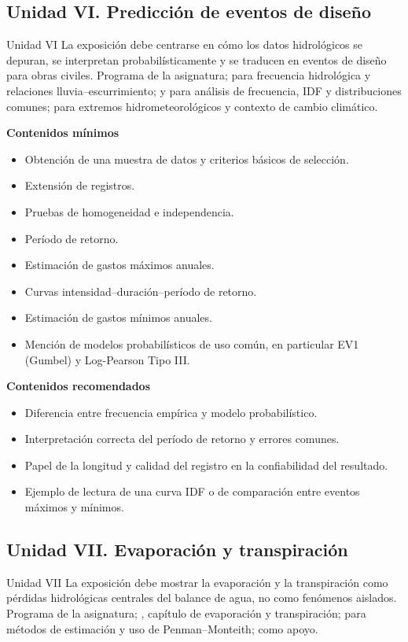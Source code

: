 \documentclass[11pt]{article}
\begin{document}
\subsection{Unidad VI. Predicción de eventos de diseño}
\unitbox
{Unidad VI}
{La exposición debe centrarse en cómo los datos hidrológicos se depuran, se interpretan probabilísticamente y se traducen en eventos de diseño para obras civiles.}
{Programa de la asignatura; \textcite{aparicio1989} para frecuencia hidrológica y relaciones lluvia--escurrimiento; \textcite{chow1994} y \textcite{mays2011} para análisis de frecuencia, IDF y distribuciones comunes; \textcite{singh2016} para extremos hidrometeorológicos y contexto de cambio climático.}

\textbf{Contenidos mínimos}
\begin{itemize}
\item Obtención de una muestra de datos y criterios básicos de selección.
\item Extensión de registros.
\item Pruebas de homogeneidad e independencia.
\item Período de retorno.
\item Estimación de gastos máximos anuales.
\item Curvas intensidad--duración--período de retorno.
\item Estimación de gastos mínimos anuales.
\item Mención de modelos probabilísticos de uso común, en particular EV1 (Gumbel) y Log-Pearson Tipo III.
\end{itemize}

\textbf{Contenidos recomendados}
\begin{itemize}
\item Diferencia entre frecuencia empírica y modelo probabilístico.
\item Interpretación correcta del período de retorno y errores comunes.
\item Papel de la longitud y calidad del registro en la confiabilidad del resultado.
\item Ejemplo de lectura de una curva IDF o de comparación entre eventos máximos y mínimos.
\end{itemize}

\subsection{Unidad VII. Evaporación y transpiración}
\unitbox
{Unidad VII}
{La exposición debe mostrar la evaporación y la transpiración como pérdidas hidrológicas centrales del balance de agua, no como fenómenos aislados.}
{Programa de la asignatura; \textcite{aparicio1989}, capítulo de evaporación y transpiración; \textcite{allen1998} para métodos de estimación y uso de Penman--Monteith; \textcite{mays2011} como apoyo.}
\end{document}
